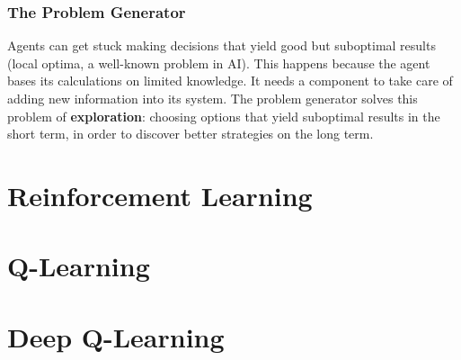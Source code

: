 \subsubsection{The Problem Generator}
Agents can get stuck making decisions that yield good but suboptimal results (local optima, a well-known problem in AI).
This happens because the agent bases its calculations on limited knowledge.
It needs a component to take care of adding new information into its system.
The problem generator solves this problem of \textbf{exploration}:
choosing options that yield suboptimal results in the short term, in order to discover better strategies on the long term.





\section{Reinforcement Learning} \label{reinforcement-learning}

\section{Q-Learning}


\section{Deep Q-Learning} \label{deep-q-learning}


